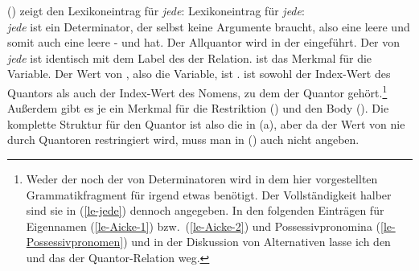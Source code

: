 () zeigt den Lexikoneintrag für \emph{jede}:
\eas
\label{le-jede}%
Lexikoneintrag für \emph{jede}:\\
\zs
\emph{jede} ist ein Determinator, der selbst keine Argumente braucht, also eine leere \argstl und
somit auch eine leere \spr- und \compsl hat. Der Allquantor wird in der \relsl eingeführt. Der
\ltopw von \emph{jede} ist identisch mit dem Label des der Relation. \argzero ist das Merkmal für die
Variable. Der Wert von \argzero, also die Variable, ist .  ist sowohl der Index-Wert
des Quantors als auch der Index-Wert des Nomens, zu dem der Quantor gehört.\footnote{
  Weder der \ltopw noch der \indw von Determinatoren wird in dem hier vorgestellten
  Grammatikfragment für irgend etwas benötigt. Der Vollständigkeit halber sind sie in
  (\ref{le-jede}) dennoch angegeben. In den folgenden Einträgen für Eigennamen (\ref{le-Aicke-1}) bzw.\ (\ref{le-Aicke-2})
  und Possessivpronomina (\ref{le-Possessivpronomen}) und in der Diskussion von Alternativen lasse ich den \ltopw und das \lbl der Quantor-Relation weg.
} Außerdem gibt es je ein Merkmal
für die Restriktion (\restr) und den Body (\body). Die komplette Struktur für den Quantor ist also
die in (a), aber da der Wert von \body nie durch Quantoren restringiert wird, muss man \body
in () auch nicht angeben.
